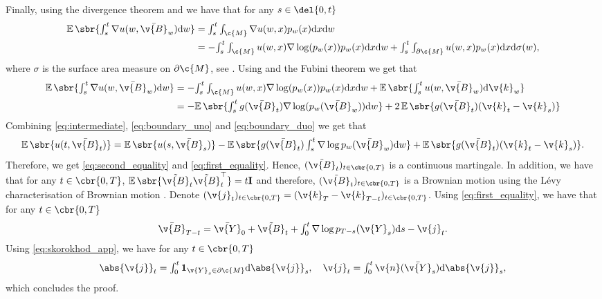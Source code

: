 Finally, using the divergence theorem and \textcite[Theorem 2.6]{burdzy2004heat} we have that for any $s \in \del{0,t}$ \begin{align} \textstyle{\E\sbr{\int_s^t \nabla u(w, \bar{\v{B}}_w) \mathrm{d} w }} & = \textstyle{\int_s^t \int_\c{M} \nabla u(w, x) p_w(x) \mathrm{d} x \mathrm{d} w } \\ & = - \textstyle{\int_s^t \int_\c{M} u(w, x) \nabla \log (p_w(x)) p_w(x) \mathrm{d} x \mathrm{d} w + \int_s^t \int_{\partial \c{M}} u(w,x) p_w(x) \mathrm{d} x \mathrm{d} \sigma(w)} , \end{align} where $\sigma$ is the surface area measure on $\partial \c{M}$, see \textcite{burdzy2004heat}.
Using  and the Fubini theorem we get that \begin{align} \textstyle{\E\sbr{\int_s^t \nabla u(w, \bar{\v{B}}_w) \mathrm{d} w }} & = - \textstyle{\int_s^t \int_\c{M} u(w, x) \nabla \log (p_w(x)) p_w(x) \mathrm{d} x \mathrm{d} w + \E\sbr{\int_s^t u(w, \bar{\v{B}}_w) \mathrm{d} \v{k}_w } } \\ & = - \textstyle{\E\sbr{\int_s^t g(\bar{\v{B}}_t) \nabla \log (p_w(\bar{\v{B}}_w))\mathrm{d} w} + 2 \E\sbr{g(\bar{\v{B}}_t)(\v{k}_t - \v{k}_s) }} \label{eq:boundary_duo} \end{align} Combining \eqref{eq:intermediate}, \eqref{eq:boundary_uno} and \eqref{eq:boundary_duo} we get that \begin{equation} \textstyle{ \E\sbr{u(t, \bar{\v{B}}_t) } = \E\sbr{u(s, \bar{\v{B}}_s) } - \E\sbr{ g(\bar{\v{B}}_t)\int_s^t \nabla \log p_w(\bar{\v{B}}_w) \mathrm{d} w }} + \textstyle{ \E\sbr{g(\bar{\v{B}}_t)(\v{k}_t - \v{k}_s) }} .
\end{equation}
Therefore, we get \eqref{eq:second_equality} and \eqref{eq:first_equality}.
Hence, $(\tilde{\v{B}}_t)_{t \in \cbr{0,T}}$ is a continuous martingale.
In addition, we have that for any $t \in \cbr{0,T}$, $\E\sbr{\tilde{\v{B}}_t \tilde{\v{B}}_t^\top} = t \m{I}$ and therefore, $(\tilde{\v{B}}_t)_{t \in \cbr{0,T}}$ is a Brownian motion using the L\'evy characterisation of Brownian motion \parencite[Chapter IV, Theorem 3.6]{revuz2013continuous}.
Denote $(\v{j}_t)_{t \in \cbr{0,T}} = (\v{k}_T - \v{k}_{T-t})_{t \in \cbr{0,T}}$.
Using \eqref{eq:first_equality}, we have that for any $t \in \cbr{0,T}$ \begin{equation} \textstyle{\bar{\v{B}}_{T-t} = \bar{\v{Y}}_0 + \tilde{\v{B}}_t + \int_0^t \nabla \log p_{T-s}(\v{Y}_s) \mathrm{d} s - \v{j}_t .
	}
\end{equation}
Using \eqref{eq:skorokhod_app}, we have for any $t \in \cbr{0,T}$ \begin{equation} \textstyle{\abs{\v{j}}_t = \int_0^t \mathbf{1}_{\v{Y}_s \in \partial \c{M}} \mathrm{d} \abs{\v{j}}_s , \quad \v{j}_t = \int_0^t \v{n}(\bar{\v{Y}}_s) \mathrm{d} \abs{\v{j}}_s ,} \end{equation} which concludes the proof.


